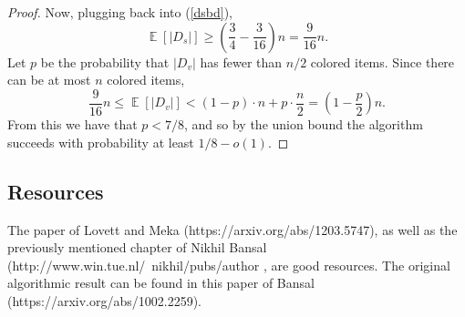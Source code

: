 \documentclass{article}
\theoremstyle{theorem}
\theoremstyle{definition}
\newcommand{\E}{\mathop{\mathbb{E}}}
\begin{document}
\begin{proof}
Now, plugging back into (\ref{dsbd}),
\begin{equation}
    \E[|D_s|] \ge \left(\frac{3}{4} - \frac{3}{16}\right)n = \frac{9}{16}n.
\end{equation}
Let $p$ be the probability that $|D_v|$ has fewer than $n/2$ colored items.
Since there can be at most $n$ colored items,
\[
    \frac{9}{16}n \le \E[|D_v|] < (1-p) \cdot n + p\cdot \frac{n}{2}  = \left(1-\frac{p}{2}\right)n.
\]
From this we have that $p < 7/8$, and so by the union bound the algorithm succeeds with probability at least $1/8 - o(1)$.
\end{proof}

\subsection*{Resources}
The paper of Lovett and Meka (https://arxiv.org/abs/1203.5747), as well as the previously mentioned chapter of Nikhil Bansal (http://www.win.tue.nl/~nikhil/pubs/author%
, are good resources.
The original algorithmic result can be found in this paper of Bansal (https://arxiv.org/abs/1002.2259).
\end{document}
